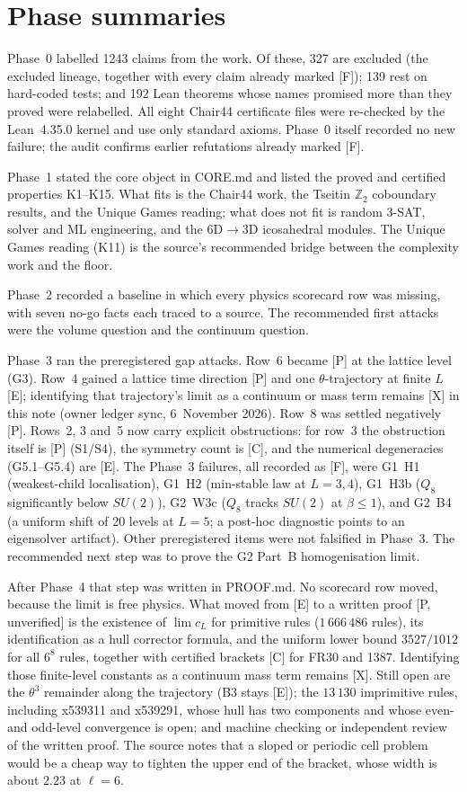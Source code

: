 \documentclass[11pt]{article}
\begin{document}
\section{Phase summaries}\label{sec:phases}
Phase~0 labelled 1243 claims from the work. Of these, 327 are excluded (the excluded lineage, together with every claim already marked [F]); 139 rest on hard-coded tests; and 192 Lean theorems whose names promised more than they proved were relabelled. All eight Chair44 certificate files were re-checked by the Lean~4.35.0 kernel and use only standard axioms. Phase~0 itself recorded no new failure; the audit confirms earlier refutations already marked [F].

Phase~1 stated the core object in CORE.md and listed the proved and certified properties K1--K15. What fits is the Chair44 work, the Tseitin $\mathbb{Z}_2$ coboundary results, and the Unique Games reading; what does not fit is random 3-SAT, solver and ML engineering, and the 6D$\to$3D icosahedral modules. The Unique Games reading (K11) is the source's recommended bridge between the complexity work and the floor.

Phase~2 recorded a baseline in which every physics scorecard row was missing, with seven no-go facts each traced to a source. The recommended first attacks were the volume question and the continuum question.

Phase~3 ran the preregistered gap attacks. Row~6 became [P] at the lattice level (G3). Row~4 gained a lattice time direction [P] and one $\theta$-trajectory at finite $L$ [E]; identifying that trajectory's limit as a continuum or mass term remains [X] in this note (owner ledger sync, 6~November 2026). Row~8 was settled negatively [P]. Rows~2, 3 and~5 now carry explicit obstructions: for row~3 the obstruction itself is [P] (S1/S4), the symmetry count is [C], and the numerical degeneracies (G5.1--G5.4) are [E]. The Phase~3 failures, all recorded as [F], were G1~H1 (weakest-child localisation), G1~H2 (min-stable law at $L=3,4$), G1~H3b ($Q_8$ significantly below $SU(2)$), G2~W3c ($Q_8$ tracks $SU(2)$ at $\beta\le 1$), and G2~B4 (a uniform shift of 20 levels at $L=5$; a post-hoc diagnostic points to an eigensolver artifact). Other preregistered items were not falsified in Phase~3. The recommended next step was to prove the G2 Part~B homogenisation limit.

After Phase~4 that step was written in PROOF.md. No scorecard row moved, because the limit is free physics. What moved from [E] to a written proof [P, unverified] is the existence of $\lim c_L$ for primitive rules ($1\,666\,486$ rules), its identification as a hull corrector formula, and the uniform lower bound $3527/1012$ for all $6^8$ rules, together with certified brackets [C] for FR30 and 1387. Identifying those finite-level constants as a continuum mass term remains [X]. Still open are the $\theta^3$ remainder along the trajectory (B3 stays [E]); the $13\,130$ imprimitive rules, including x539311 and x539291, whose hull has two components and whose even- and odd-level convergence is open; and machine checking or independent review of the written proof. The source notes that a sloped or periodic cell problem would be a cheap way to tighten the upper end of the bracket, whose width is about $2.23$ at $\ell=6$.
\end{document}
